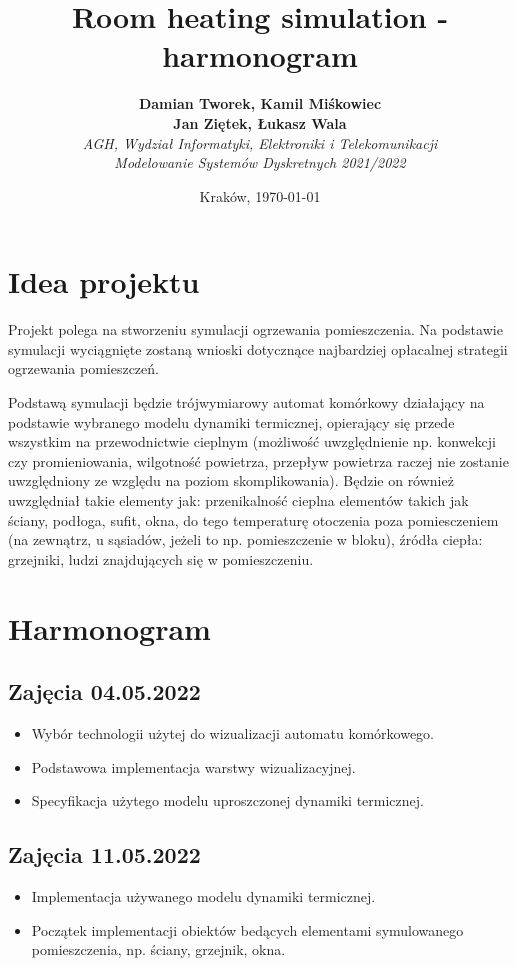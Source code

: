 \documentclass{article}
\title{Room heating simulation - harmonogram}
\author{\textbf{Damian Tworek, Kamil Miśkowiec} \\ \textbf{Jan Ziętek, Łukasz Wala}\\
    \textit{AGH, Wydział Informatyki, Elektroniki i Telekomunikacji} \\
    \textit{Modelowanie Systemów Dyskretnych 2021/2022}}
\date{Kraków, \today}
\begin{document}
\maketitle

\section{Idea projektu}
Projekt polega na stworzeniu symulacji ogrzewania pomieszczenia. Na podstawie symulacji wyciągnięte zostaną
wnioski dotycznące najbardziej opłacalnej strategii ogrzewania pomieszczeń. 

Podstawą symulacji będzie trójwymiarowy automat komórkowy działający na podstawie wybranego modelu dynamiki termicznej,
opierający się przede wszystkim na przewodnictwie cieplnym (możliwość uwzględnienie np. konwekcji czy promieniowania, wilgotność powietrza,
przepływ powietrza raczej nie zostanie uwzględniony ze względu na poziom skomplikowania).
Będzie on również uwzględniał takie elementy jak: przenikalność cieplna elementów takich jak ściany, podłoga, sufit, okna, do tego temperaturę
otoczenia poza pomiesczeniem (na zewnątrz, u sąsiadów, jeżeli to np. pomieszczenie w bloku), źródła ciepła: grzejniki, ludzi znajdujących
się w pomieszczeniu.

\section{Harmonogram}
\subsection{Zajęcia 04.05.2022}

\begin{itemize}
    \item
    Wybór technologii użytej do wizualizacji automatu komórkowego.
    \item
    Podstawowa implementacja warstwy wizualizacyjnej.
    \item
    Specyfikacja użytego modelu uproszczonej dynamiki termicznej.
\end{itemize}

\subsection{Zajęcia 11.05.2022}

\begin{itemize}
    \item
    Implementacja używanego modelu dynamiki termicznej.
    \item
    Początek implementacji obiektów bedących elementami symulowanego pomieszczenia, np. ściany, grzejnik, okna.
\end{itemize}
\end{document}
